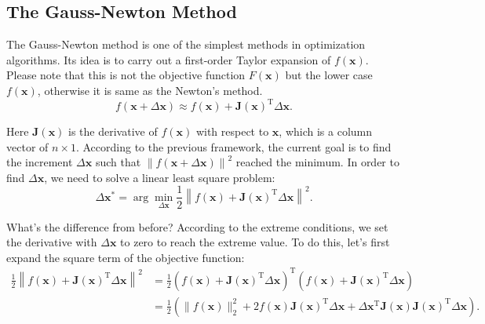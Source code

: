 \subsection{The Gauss-Newton Method}
The Gauss-Newton method is one of the simplest methods in optimization algorithms. Its idea is to carry out a first-order Taylor expansion of $f(\mathbf{x})$. Please note that this is not the objective function $F(\mathbf{x})$ but the lower case $f(\mathbf{x})$, otherwise it is same as the Newton's method.
\begin{equation}
    \label{eq:approximation}
    f\left( {\mathbf{x} + \Delta \mathbf{x}} \right) \approx f\left( \mathbf{x} \right) + \mathbf{J} \left( \mathbf{x} \right)^\mathrm{T} \Delta \mathbf{x}.
\end{equation}

Here $\mathbf{J}(\mathbf{x})$ is the derivative of $f(\mathbf{x})$ with respect to $\mathbf{x}$, which is a column vector of $n \times 1$. According to the previous framework, the current goal is to find the increment $\Delta \mathbf{x}$ such that $\left\| {f\left( \mathbf{x} + \Delta \mathbf{x} \right)} \right \|^2$ reached the minimum. In order to find $\Delta \mathbf{x}$, we need to solve a linear least square problem:
\begin{equation}
    \Delta \mathbf{x}^* = \arg \mathop {\min }\limits_{\Delta \mathbf{x}} \frac{1}{2}{\left\| {f\left( \mathbf{x} \right) + \mathbf{J} \left( \mathbf{x} \right)^\mathrm{T} \Delta \mathbf{x} } \right\|^2}.
\end{equation}
    
What's the difference from before? According to the extreme conditions, we set the derivative with $\Delta \mathbf{x}$ to zero to reach the extreme value. To do this, let's first expand the square term of the objective function:
\begin{align*}
    \frac{1}{2}{\left\| {f\left( \mathbf{x} \right) + \mathbf{J} \left( \mathbf{x} \right)^\mathrm{T} \Delta \mathbf{x}} \right\|^2} &= \frac{1}{2}{\left( {f\left( \mathbf{x} \right) + \mathbf{J}\left( \mathbf{x} \right)^\mathrm{T} \Delta \mathbf{x}} \right)^\mathrm{T}}\left( {f\left( \mathbf{x} \right) + \mathbf{J} \left( \mathbf{x} \right)^\mathrm{T} \Delta \mathbf{x}} \right)\\
    &= \frac{1}{2}\left( \| f{{\left( \mathbf{x} \right)}\|^2_2 + 2 f\left( \mathbf{x} \right) \mathbf{J} {{\left( \mathbf{x} \right)}}^\mathrm{T} \Delta \mathbf{x} + \Delta { \mathbf{x}^\mathrm{T}}{\mathbf{J} (\mathbf{x})} \mathbf{J}(\mathbf{x})^\mathrm{T} \Delta \mathbf{x}} \right).
\end{align*}


